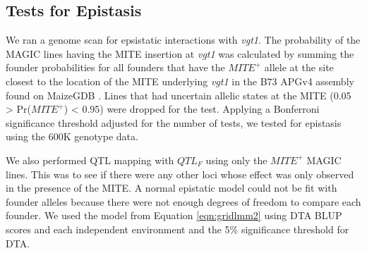 \documentclass[article,9pt,twocolumn,twoside]{rilabRxiv}
\newcommand{\jri}[1]{{\small \textcolor{red}{#1}}}
\begin{document}

\subsection{Tests for Epistasis}
We ran a genome scan for epsistatic interactions with \emph{vgt1}.
The probability of the MAGIC lines having the MITE insertion at \emph{vgt1} was calculated by summing the founder probabilities for all founders that have the $MITE^+$ allele at the site closest to the location of the MITE underlying \emph{vgt1} in the B73 APGv4 assembly found on MaizeGDB \citep{Portwood}.
Lines that had uncertain allelic states at the MITE (0.05 > Pr($MITE^+$) < 0.95) were dropped for the test.
Applying a Bonferroni significance threshold adjusted for the number of tests, we tested for epistasis using the 600K genotype data.

We also performed QTL mapping with $QTL_F$ using only the $MITE^+$ MAGIC lines.
This was to see if there were any other loci whose effect was only observed in the presence of the MITE.
A normal epistatic model could not be fit with founder alleles because there were not enough degrees of freedom to compare each founder.
We used the model from Equation \ref{eqn:gridlmm2} using DTA BLUP scores and each independent environment and the 5\% significance threshold for DTA.
\end{document}
